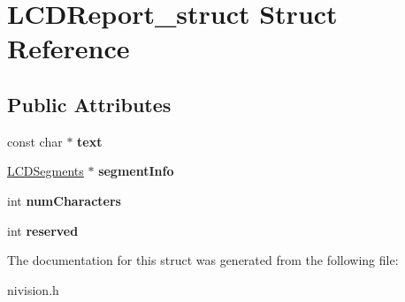 \hypertarget{structLCDReport__struct}{
\section{LCDReport\_\-struct Struct Reference}
\label{structLCDReport__struct}
}
\subsection*{Public Attributes}
\begin{DoxyCompactItemize}
\item 
\hypertarget{structLCDReport__struct_a8e5652660acf87b59ff1d3298cc8889a}{
const char $\ast$ {\bfseries text}}
\label{structLCDReport__struct_a8e5652660acf87b59ff1d3298cc8889a}

\item 
\hypertarget{structLCDReport__struct_a67982aa26d505b5a83cf50e7a89fcdcd}{
\hyperlink{structLCDSegments__struct}{LCDSegments} $\ast$ {\bfseries segmentInfo}}
\label{structLCDReport__struct_a67982aa26d505b5a83cf50e7a89fcdcd}

\item 
\hypertarget{structLCDReport__struct_abaef90e8340b143532f3fd2d59e8a9e3}{
int {\bfseries numCharacters}}
\label{structLCDReport__struct_abaef90e8340b143532f3fd2d59e8a9e3}

\item 
\hypertarget{structLCDReport__struct_a73ebedf83a91bbc65c1380cf697d5c0f}{
int {\bfseries reserved}}
\label{structLCDReport__struct_a73ebedf83a91bbc65c1380cf697d5c0f}

\end{DoxyCompactItemize}


The documentation for this struct was generated from the following file:\begin{DoxyCompactItemize}
\item 
nivision.h\end{DoxyCompactItemize}
